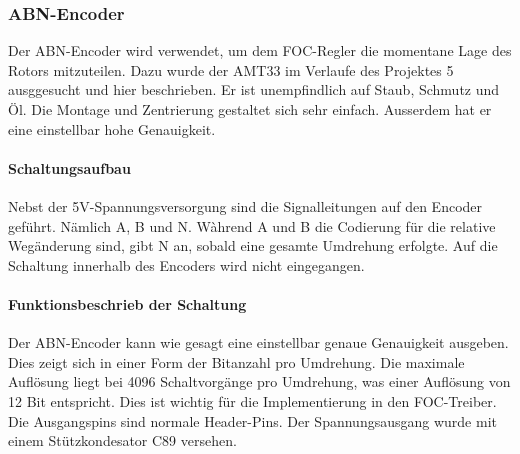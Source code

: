 \subsubsection{ABN-Encoder}
\label{subsubsec:ABN-Encoder}

Der ABN-Encoder wird verwendet, um dem FOC-Regler die momentane Lage des Rotors mitzuteilen. Dazu wurde der AMT33 im Verlaufe des Projektes 5 ausggesucht und hier beschrieben. Er ist unempfindlich auf Staub, Schmutz und Öl. Die Montage und Zentrierung gestaltet sich sehr einfach. Ausserdem hat er eine einstellbar hohe Genauigkeit. \cite[S.1]{cui_devices_cui_2019}

\paragraph{Schaltungsaufbau}\mbox{}

Nebst der 5V-Spannungsversorgung sind die Signalleitungen auf den Encoder geführt. Nämlich A, B und N. Wàhrend A und B die Codierung für die relative Wegänderung sind, gibt N an, sobald eine gesamte Umdrehung erfolgte. Auf die Schaltung innerhalb des Encoders wird nicht eingegangen.

\paragraph{Funktionsbeschrieb der Schaltung}\mbox{}

Der ABN-Encoder kann wie gesagt eine einstellbar genaue Genauigkeit ausgeben. Dies zeigt sich in einer Form der Bitanzahl pro Umdrehung. Die maximale Auflösung liegt bei 4096 Schaltvorgänge pro Umdrehung, was einer Auflösung von 12 Bit entspricht. Dies ist wichtig für die Implementierung in den FOC-Treiber. Die Ausgangspins sind normale Header-Pins. Der Spannungsausgang wurde mit einem Stützkondesator C89 versehen.

